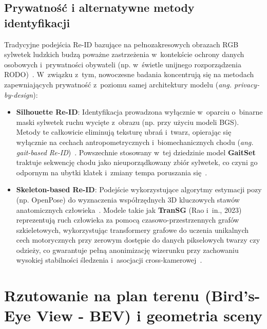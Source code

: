 \subsection{Prywatność i alternatywne metody identyfikacji}
\label{subsec:privacy_reid}

Tradycyjne podejścia Re-ID bazujące na pełnozakresowych obrazach RGB sylwetek ludzkich budzą
poważne zastrzeżenia w~kontekście ochrony danych osobowych i~prywatności obywateli (np. w~świetle
unijnego rozporządzenia RODO)~\cite{ristani2016}. W~związku z~tym, nowoczesne badania koncentrują
się na metodach zapewniających prywatność z~poziomu samej architektury modelu (\textit{ang.
  privacy-by-design}):
\begin{itemize}
  \item \textbf{Silhouette Re-ID}: Identyfikacja prowadzona wyłącznie w~oparciu o~binarne maski sylwetek ruchu wycięte z~obrazu (np. przy użyciu modeli BGS). Metody te całkowicie eliminują teksturę ubrań i~twarz, opierając się wyłącznie na cechach antropometrycznych i~biomechanicznych chodu (\textit{ang. gait-based Re-ID})~\cite{chao2019gaitset}. Powszechnie stosowany w~tej dziedzinie model \textbf{GaitSet} traktuje sekwencję chodu jako nieuporządkowany zbiór sylwetek, co czyni go odpornym na ubytki klatek i~zmiany tempa poruszania się~\cite{chao2019gaitset}.
  \item \textbf{Skeleton-based Re-ID}: Podejście wykorzystujące algorytmy estymacji pozy (np. OpenPose) do wyznaczenia współrzędnych 3D kluczowych stawów anatomicznych człowieka~\cite{rao2023transg}. Modele takie jak \textbf{TranSG} (Rao i~in., 2023) reprezentują ruch człowieka za pomocą czasowo-przestrzennych grafów szkieletowych, wykorzystując transformery grafowe do uczenia unikalnych cech motorycznych przy zerowym dostępie do danych pikselowych twarzy czy odzieży, co gwarantuje pełną anonimizację wizerunku przy zachowaniu wysokiej stabilności śledzenia i~asocjacji cross-kamerowej~\cite{rao2023transg}.
\end{itemize}

\section{Rzutowanie na plan terenu (Bird’s-Eye View - BEV) i geometria sceny}


